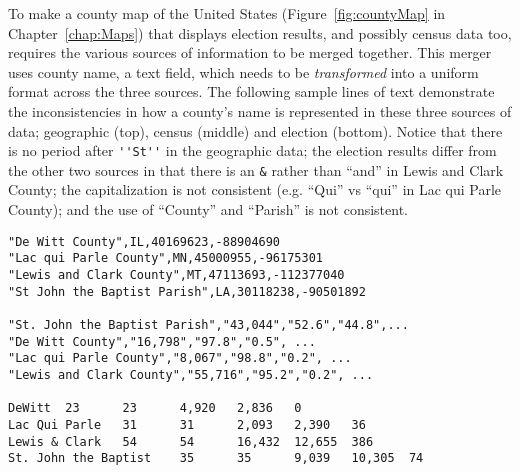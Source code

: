 To make a county map of the United States (Figure~\ref{fig:countyMap}
in Chapter~\ref{chap:Maps}) that displays election results, and
possibly census data too, requires the various sources of information
to be merged together. This merger uses county name, a text field,
which needs to be \textit{transformed} into a uniform format across
the three sources.  The following sample lines of text demonstrate the
inconsistencies in how a county's name is represented in these three
sources of data; geographic (top), census (middle) and election
(bottom).  Notice that there is no period after \verb+''St''+ in the
geographic data; the election results differ from the other two
sources in that there is an \verb+&+ rather than ``and'' in Lewis and
Clark County; the capitalization is not consistent (e.g. ``Qui'' vs
``qui'' in Lac qui Parle County); and the use of ``County'' and
``Parish'' is not consistent.
\begin{comment}
Unfortunately the naming conventions for the counties are slightly
different from one source to the next.  For example, the county names
in the election data do not contain ``County'' as part of the name but
the other sources do include it in the name.  Also, the county names
in the geographic data do not include the period after ``St.'' in
names such as St. John the Baptist, but the other sources do use the
period.  In order to match up the election results with the census
data and plot them in the proper place these inconsistencies must be
resolved.
\end{comment}

{\footnotesize{
\begin{verbatim}
"De Witt County",IL,40169623,-88904690
"Lac qui Parle County",MN,45000955,-96175301
"Lewis and Clark County",MT,47113693,-112377040
"St John the Baptist Parish",LA,30118238,-90501892

"St. John the Baptist Parish","43,044","52.6","44.8",...
"De Witt County","16,798","97.8","0.5", ...
"Lac qui Parle County","8,067","98.8","0.2", ...
"Lewis and Clark County","55,716","95.2","0.2", ...

DeWitt  23      23      4,920   2,836   0
Lac Qui Parle   31      31      2,093   2,390   36
Lewis & Clark   54      54      16,432  12,655  386
St. John the Baptist    35      35      9,039   10,305  74
\end{verbatim}
}}
\begin{comment}
  \caption{These sample lines of text demonstrate the inconsistencies
    in how a county's name is represented in three sources of data:
    geographic (top), census (middle) and election (bottom).  Notice
    that there is no period after ``St'' in the geographic data; the
    election results differ from the other two sources in that there
    is an ``\&'' rather than ``and'' in Lewis and Clark County; the
    capitalization is not consistent (e.g. ``Qui'' vs ``qui'' in Lac
    qui Parle County); and the use of ``County'' and ``Parish'' is not
    consistent.}\label{fig:censusRegEx}
\end{comment}


